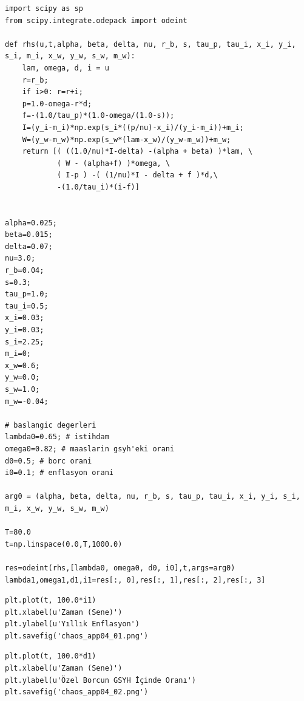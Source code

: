 \documentclass[12pt,fleqn]{article}\usepackage{../../common}
\begin{document}
\begin{verbatim}
import scipy as sp
from scipy.integrate.odepack import odeint

def rhs(u,t,alpha, beta, delta, nu, r_b, s, tau_p, tau_i, x_i, y_i, s_i, m_i, x_w, y_w, s_w, m_w):
    lam, omega, d, i = u
    r=r_b;
    if i>0: r=r+i; 
    p=1.0-omega-r*d;
    f=-(1.0/tau_p)*(1.0-omega/(1.0-s));
    I=(y_i-m_i)*np.exp(s_i*((p/nu)-x_i)/(y_i-m_i))+m_i;
    W=(y_w-m_w)*np.exp(s_w*(lam-x_w)/(y_w-m_w))+m_w;
    return [( ((1.0/nu)*I-delta) -(alpha + beta) )*lam, \
            ( W - (alpha+f) )*omega, \
            ( I-p ) -( (1/nu)*I - delta + f )*d,\
            -(1.0/tau_i)*(i-f)]
    

alpha=0.025;     
beta=0.015;      
delta=0.07;      
nu=3.0;
r_b=0.04;        
s=0.3;
tau_p=1.0;
tau_i=0.5;
x_i=0.03;
y_i=0.03;
s_i=2.25;
m_i=0;
x_w=0.6;
y_w=0.0;
s_w=1.0;
m_w=-0.04;

# baslangic degerleri
lambda0=0.65; # istihdam
omega0=0.82; # maaslarin gsyh'eki orani
d0=0.5; # borc orani
i0=0.1; # enflasyon orani

arg0 = (alpha, beta, delta, nu, r_b, s, tau_p, tau_i, x_i, y_i, s_i, m_i, x_w, y_w, s_w, m_w)

T=80.0
t=np.linspace(0.0,T,1000.0)

res=odeint(rhs,[lambda0, omega0, d0, i0],t,args=arg0)
lambda1,omega1,d1,i1=res[:, 0],res[:, 1],res[:, 2],res[:, 3]
\end{verbatim}

\begin{verbatim}
plt.plot(t, 100.0*i1)
plt.xlabel(u'Zaman (Sene)')
plt.ylabel(u'Yıllık Enflasyon')
plt.savefig('chaos_app04_01.png')
\end{verbatim}

\begin{verbatim}
plt.plot(t, 100.0*d1)
plt.xlabel(u'Zaman (Sene)')
plt.ylabel(u'Özel Borcun GSYH İçinde Oranı')
plt.savefig('chaos_app04_02.png')
\end{verbatim}
\end{document}
